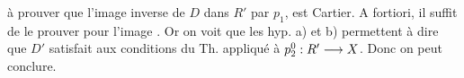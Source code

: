 à prouver que l'image inverse de $D$  dans $R'$ par $p_1$,  est Cartier. A fortiori, il suffit de le prouver pour l'image . Or  on voit que les hyp. a) et b) permettent à dire que $D'$ satisfait aux conditions du Th. appliqué à $p_{2}^0:R'\longrightarrow X$.  Donc on peut conclure.
